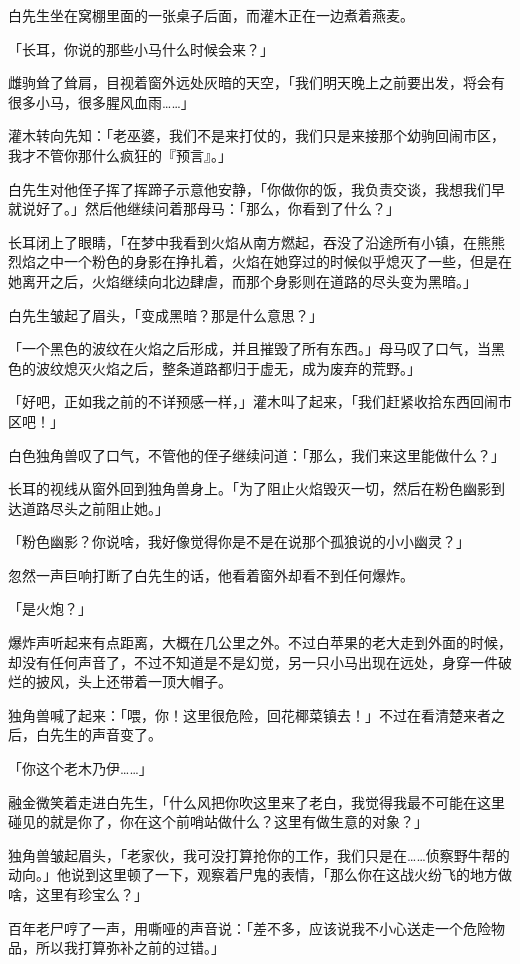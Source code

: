 白先生坐在窝棚里面的一张桌子后面，而灌木正在一边煮着燕麦。

「长耳，你说的那些小马什么时候会来？」

雌驹耸了耸肩，目视着窗外远处灰暗的天空，「我们明天晚上之前要出发，将会有很多小马，很多腥风血雨……」

灌木转向先知：「老巫婆，我们不是来打仗的，我们只是来接那个幼驹回闹市区，我才不管你那什么疯狂的『预言』。」

白先生对他侄子挥了挥蹄子示意他安静，「你做你的饭，我负责交谈，我想我们早就说好了。」然后他继续问着那母马：「那么，你看到了什么？」

长耳闭上了眼睛，「在梦中我看到火焰从南方燃起，吞没了沿途所有小镇，在熊熊烈焰之中一个粉色的身影在挣扎着，火焰在她穿过的时候似乎熄灭了一些，但是在她离开之后，火焰继续向北边肆虐，而那个身影则在道路的尽头变为黑暗。」

白先生皱起了眉头，「变成黑暗？那是什么意思？」

「一个黑色的波纹在火焰之后形成，并且摧毁了所有东西。」母马叹了口气，当黑色的波纹熄灭火焰之后，整条道路都归于虚无，成为废弃的荒野。」

「好吧，正如我之前的不详预感一样，」灌木叫了起来，「我们赶紧收拾东西回闹市区吧！」

白色独角兽叹了口气，不管他的侄子继续问道：「那么，我们来这里能做什么？」

长耳的视线从窗外回到独角兽身上。「为了阻止火焰毁灭一切，然后在粉色幽影到达道路尽头之前阻止她。」

「粉色幽影？你说啥，我好像觉得你是不是在说那个孤狼说的小小幽灵？」

忽然一声巨响打断了白先生的话，他看着窗外却看不到任何爆炸。

「是火炮？」

爆炸声听起来有点距离，大概在几公里之外。不过白苹果的老大走到外面的时候，却没有任何声音了，不过不知道是不是幻觉，另一只小马出现在远处，身穿一件破烂的披风，头上还带着一顶大帽子。

独角兽喊了起来：「喂，你！这里很危险，回花椰菜镇去！」不过在看清楚来者之后，白先生的声音变了。

「你这个老木乃伊……」

融金微笑着走进白先生，「什么风把你吹这里来了老白，我觉得我最不可能在这里碰见的就是你了，你在这个前哨站做什么？这里有做生意的对象？」

独角兽皱起眉头，「老家伙，我可没打算抢你的工作，我们只是在……侦察野牛帮的动向。」他说到这里顿了一下，观察着尸鬼的表情，「那么你在这战火纷飞的地方做啥，这里有珍宝么？」

百年老尸哼了一声，用嘶哑的声音说：「差不多，应该说我不小心送走一个危险物品，所以我打算弥补之前的过错。」

